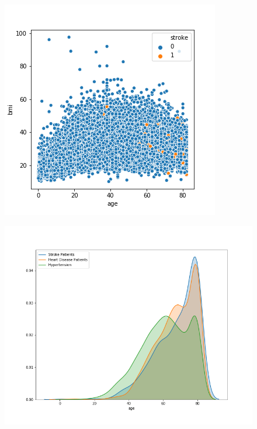 \documentclass[proposal]{softeng}
\begin{document}
\begin{figure}
\centering
\begin{minipage}[t]{.4\textwidth}

\centering

\includegraphics[width=\textwidth]{images/building_ann/age_bmi_scatterplot.png}


\label{fig:age_bmi_scatterplot}
\end{minipage}
\begin{minipage}[t]{.5\textwidth}

\centering

\includegraphics[width=\textwidth]{images/building_ann/stroke_age_distplot.png}


\label{fig:age_of_stroke_patients}
\end{minipage}
\end{figure}
\end{document}

